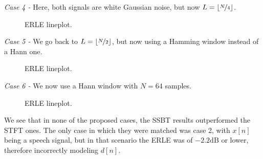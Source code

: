 \noindent\textit{Case 4 -} Here, both signals are white Gaussian noise, but now $L = \left\lfloor \nicefrac{N}{4} \right\rfloor$.

\begin{figure}[H]
	\centering
	
	\caption{ERLE lineplot.}
	\label{fig:sec4:lineplot_erle_case4}
\end{figure}

\noindent\textit{Case 5 -} We go back to $L = \left\lfloor \nicefrac{N}{2} \right\rfloor$, but now using a Hamming window instead of a Hann one.

\begin{figure}[H]
	\centering
	
	\caption{ERLE lineplot.}
	\label{fig:sec4:lineplot_erle_case5}
\end{figure}

\noindent\textit{Case 6 -} We now use a Hann window with $N = 64$ samples.

\begin{figure}[H]
\centering

\caption{ERLE lineplot.}
\label{fig:sec4:lineplot_erle_case6}
\end{figure}

We see that in none of the proposed cases, the SSBT results outperformed the STFT ones. The only case in which they were matched was case 2, with $x[n]$ being a speech signal, but in that scenario the ERLE was of $-2.2\text{dB}$ or lower, therefore incorrectly modeling $d[n]$.